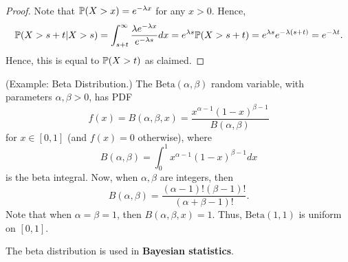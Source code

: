 \documentclass[letterpaper]{article}
\begin{document}
\begin{mdframed}[]
    \begin{proof}
        Note that $\mathbb{P}(X > x) = e^{-\lambda x}$ for any $x > 0$. Hence, 
        \[\mathbb{P}(X > s + t | X > s) = \int_{s + t}^{\infty} \frac{\lambda e^{-\lambda x}}{e^{-\lambda s}} dx = e^{\lambda s} \mathbb{P}(X > s + t) = e^{\lambda s} e^{-\lambda (s + t)} = e^{-\lambda t}.\]
        Hence, this is equal to $\mathbb{P}(X > t)$ as claimed. 
    \end{proof}
\end{mdframed}

\begin{mdframed}[]
    (Example: Beta Distribution.) The $\text{Beta}(\alpha, \beta)$ random variable, with parameters $\alpha, \beta > 0$, has PDF 
    \[f(x) = B(\alpha, \beta, x) = \frac{x^{\alpha - 1}(1 - x)^{\beta - 1}}{B(\alpha, \beta)}\]
    for $x \in [0, 1]$ (and $f(x) = 0$ otherwise), where 
    \[B(\alpha, \beta) = \int_{0}^{1} x^{\alpha - 1}(1 - x)^{\beta - 1} dx\]
    is the beta integral. Now, when $\alpha, \beta$ are integers, then 
    \[B(\alpha, \beta) = \frac{(\alpha - 1)!(\beta - 1)!}{(\alpha + \beta - 1)!}.\] 
    Note that when $\alpha = \beta = 1$, then $B(\alpha, \beta, x) = 1$. Thus, $\text{Beta}(1, 1)$ is uniform on $[0, 1]$. 
\end{mdframed}
The beta distribution is used in \textbf{Bayesian statistics}. 
\end{document}
